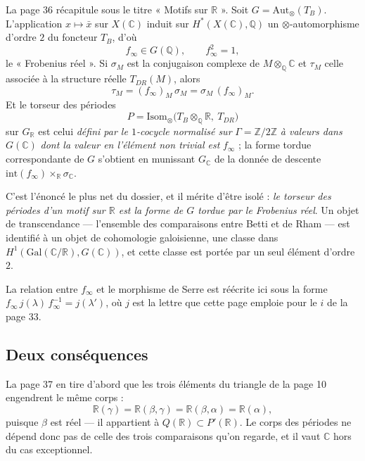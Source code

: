 \documentclass[11pt,a4paper]{article}
\begin{document}
La page 36 récapitule sous le titre « Motifs sur $\mathbb{R}$ ». Soit $G =
\mathrm{Aut}_{\otimes}(T_{B})$. L'application $x \mapsto \bar{x}$ sur
$X(\mathbb{C})$ induit sur $H^{*}(X(\mathbb{C}), \mathbb{Q})$ un
$\otimes$-automorphisme d'ordre $2$ du foncteur $T_{B}$, d'où
\[
  f_{\infty} \in G(\mathbb{Q}) , \qquad f_{\infty}^{2} = 1 ,
\]
le « Frobenius réel ». Si $\sigma_{M}$ est la conjugaison complexe de
$M \otimes_{\mathbb{Q}} \mathbb{C}$ et $\tau_{M}$ celle associée à la structure
réelle $T_{DR}(M)$, alors
\[
  \tau_{M} = (f_{\infty})_{M}\, \sigma_{M} = \sigma_{M}\, (f_{\infty})_{M} .
\]
Et le torseur des périodes
\[
  P = \mathrm{Isom}_{\otimes}\bigl(T_{B} \otimes_{\mathbb{Q}}
  \mathbb{R},\ T_{DR}\bigr)
\]
sur $G_{\mathbb{R}}$ est celui \emph{défini par le $1$-cocycle normalisé sur}
$\Gamma = \mathbb{Z}/2\mathbb{Z}$ \emph{à valeurs dans} $G(\mathbb{C})$
\emph{dont la valeur en l'élément non trivial est} $f_{\infty}$ ; la forme
tordue correspondante de $G$ s'obtient en munissant $G_{\mathbb{C}}$ de la
donnée de descente $\mathrm{int}(f_{\infty}) \times_{\mathbb{R}}
\sigma_{\mathbb{C}}$.

C'est l'énoncé le plus net du dossier, et il mérite d'être isolé : \emph{le
torseur des périodes d'un motif sur $\mathbb{R}$ est la forme de $G$ tordue par
le Frobenius réel}. Un objet de transcendance — l'ensemble des comparaisons
entre Betti et de Rham — est identifié à un objet de cohomologie galoisienne, une
classe dans $H^{1}(\mathrm{Gal}(\mathbb{C}/\mathbb{R}), G(\mathbb{C}))$, et
cette classe est portée par un seul élément d'ordre $2$.

La relation entre $f_{\infty}$ et le morphisme de Serre est réécrite ici sous la
forme $f_{\infty}\, j(\lambda)\, f_{\infty}^{-1} = j(\lambda')$, où $j$ est la
lettre que cette page emploie pour le $i$ de la page 33.

\subsection*{Deux conséquences}

La page 37 en tire d'abord que les trois éléments du triangle de la page 10
engendrent le même corps :
\[
  \mathbb{R}(\gamma) = \mathbb{R}(\beta, \gamma) = \mathbb{R}(\beta, \alpha)
  = \mathbb{R}(\alpha) ,
\]
puisque $\beta$ est réel — il appartient à $Q(\mathbb{R}) \subset
P'(\mathbb{R})$. Le corps des périodes ne dépend donc pas de celle des trois
comparaisons qu'on regarde, et il vaut $\mathbb{C}$ hors du cas exceptionnel.
\end{document}
